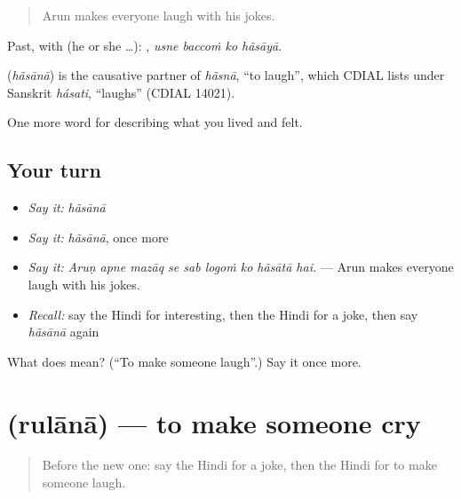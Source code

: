 \begin{quote}
Arun makes everyone laugh with his jokes.
\end{quote}

Past, with  (he or she …):    , \emph{usne baccoṁ ko hãsāyā}.

\begin{cousinweb}
\textbf{} (\emph{hãsānā}) is the causative partner of \emph{hãsnā}, \textquotedblleft{}to laugh\textquotedblright{}, which CDIAL lists under Sanskrit \emph{hásati}, \textquotedblleft{}laughs\textquotedblright{} (CDIAL 14021).
\end{cousinweb}

\begin{grammarlens}[title={What you've built}]
One more word for describing what you lived and felt.
\end{grammarlens}

\subsection*{Your turn}
\begin{itemize}
\raggedright
  \item \emph{Say it:} \emph{hãsānā}
  \item \emph{Say it:} \emph{hãsānā}, once more
  \item \emph{Say it:} \emph{Aruṇ apne mazāq se sab logoṁ ko hãsātā hai.} — Arun makes everyone laugh with his jokes.
  \item \emph{Recall:} say the Hindi for interesting, then the Hindi for a joke, then say \emph{hãsānā} again
\end{itemize}

\begin{tcolorbox}[breakable,colback=teal!4,colframe=teal!35!black,title={Before you move on}]
What does  mean? (\textquotedblleft{}To make someone laugh\textquotedblright{}.) Say it once more.
\end{tcolorbox}
\section[\texorpdfstring{\hi{रुलाना} (rulānā)}{रुलाना (rulānā)}]{ (rulānā) — to make someone cry}

\label{lesson:HI-C465-rulana}



\begin{quote}
Before the new one: say the Hindi for a joke, then the Hindi for to make someone laugh.
\end{quote}

